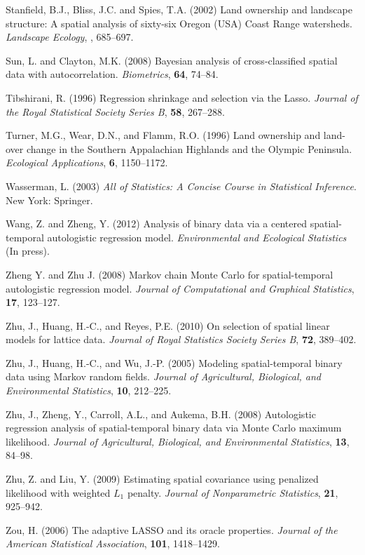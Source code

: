 \documentclass[authoryear,review, 12pt]{elsarticle}
\begin{document}
\begin{thebibliography}{00}
 Stanfield, B.J., Bliss, J.C. and Spies, T.A. (2002) Land ownership and landscape structure: {A} spatial analysis of sixty-six Oregon (USA) Coast Range watersheds. \textit{Landscape Ecology}, , 685--697. 

 Sun, L. and Clayton, M.K. (2008) Bayesian analysis of cross-classified spatial data with autocorrelation. \textit{Biometrics}, \textbf{64}, 74--84.

 Tibshirani, R. (1996) Regression shrinkage and selection via the {L}asso. \textit{Journal of the Royal Statistical Society Series B}, \textbf{58}, 267--288.

 Turner, M.G., Wear, D.N., and Flamm, R.O.  (1996) Land ownership and land-over change in the {S}outhern {A}ppalachian {H}ighlands and the {O}lympic {P}eninsula. \textit{Ecological Applications},  \textbf{6}, 1150--1172. 

 Wasserman, L. (2003) \textit{All of Statistics: A Concise Course in Statistical Inference}. New York: Springer.

 Wang, Z. and Zheng, Y. (2012) Analysis of binary data via a centered spatial-temporal autologistic regression model. \textit{Environmental and Ecological Statistics} (In press).

 Zheng Y. and Zhu J. (2008) Markov chain {M}onte {C}arlo for spatial-temporal autologistic regression model. \textit{Journal of Computational and Graphical Statistics}, \textbf{17}, 123--127.

 Zhu, J., Huang, H.-C., and Reyes, P.E. (2010) On selection of spatial linear models for lattice data. \textit{Journal of Royal Statistics Society Series B}, \textbf{72}, 389--402.

 Zhu, J., Huang, H.-C., and Wu, J.-P. (2005) Modeling spatial-temporal binary data using {M}arkov random fields. \textit{Journal of Agricultural, Biological, and Environmental Statistics}, \textbf{10}, 212--225.

 Zhu, J., Zheng, Y., Carroll, A.L., and Aukema, B.H. (2008) Autologistic regression analysis of spatial-temporal binary data via {M}onte {C}arlo maximum likelihood. \textit{Journal of Agricultural, Biological, and Environmental Statistics}, \textbf{13}, 84--98.

 Zhu, Z. and Liu, Y. (2009) Estimating spatial covariance using penalized likelihood with weighted ${L}_1$ penalty. \textit{Journal of Nonparametric Statistics}, \textbf{21}, 925--942.

 Zou, H. (2006) The adaptive {LASSO} and its oracle properties. \textit{Journal of the American Statistical Association}, \textbf{101}, 1418--1429.

\end{thebibliography}
\end{document}
